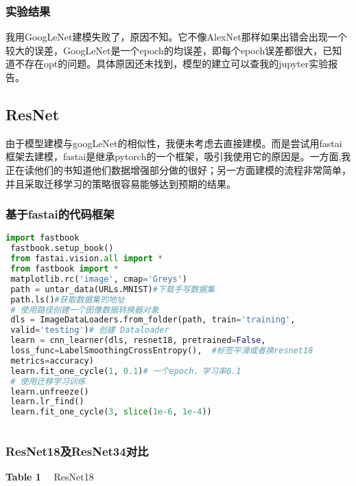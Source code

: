 \subsubsection{实验结果}
我用GoogLeNet建模失败了，原因不知。它不像AlexNet那样如果出错会出现一个较大的误差，GoogLeNet是一个epoch的均误差，即每个epoch误差都很大，已知道不存在opt的问题。具体原因还未找到，模型的建立可以查我的jupyter实验报告。
\subsection{ResNet}
由于模型建模与googLeNet的相似性，我便未考虑去直接建模。而是尝试用fastai框架去建模，fastai是继承pytorch的一个框架，吸引我使用它的原因是。一方面,我正在读他们的书知道他们数据增强部分做的很好；另一方面建模的流程非常简单，并且采取迁移学习的策略很容易能够达到预期的结果。
\subsubsection{基于fastai的代码框架}
 \begin{lstlisting}[language=python]
 import fastbook
 fastbook.setup_book()
 from fastai.vision.all import *
 from fastbook import *
 matplotlib.rc('image', cmap='Greys')
 path = untar_data(URLs.MNIST)#下载手写数据集
 path.ls()#获取数据集的地址
 # 使用路径创建一个图像数据转换器对象
 dls = ImageDataLoaders.from_folder(path, train='training', 
 valid='testing')# 创建 Dataloader
 learn = cnn_learner(dls, resnet18, pretrained=False,
 loss_func=LabelSmoothingCrossEntropy(),  #标签平滑或者换resnet18
 metrics=accuracy)
 learn.fit_one_cycle(1, 0.1)# 一个epoch，学习率0.1
 # 使用迁移学习训练
 learn.unfreeze()
 learn.lr_find()
 learn.fit_one_cycle(3, slice(1e-6, 1e-4))
	
\end{lstlisting}

\subsubsection{ResNet18及ResNet34对比}
\newpage
\begin{center}
	\textbf{Table 1}~~ ResNet18\\
\end{center}


